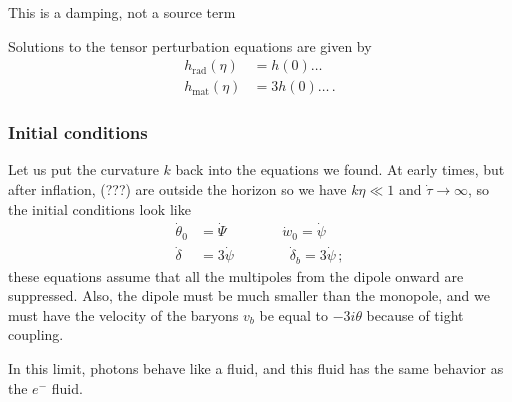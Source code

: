\documentclass[main.tex]{subfiles}
\begin{document}
This is a damping, not a source term


Solutions to the tensor perturbation equations are given by 
%
\begin{align}
h _{\text{rad}} (\eta ) &= h(0) \dots  \\
h _{\text{mat}} (\eta ) &= 3 h(0) \dots
\,.
\end{align}

\subsubsection{Initial conditions}

Let us put the curvature \(k\) back into the equations we found. 
At early times, but after inflation, (???) are outside the horizon
so we have \(k \eta \ll 1\) and \(\dot{\tau} \rightarrow \infty \), so the initial conditions look like 
%
\begin{align}
\dot{\theta}_{0} &= \dot{\Psi} 
\qquad \qquad
\dot{w}_{0} = \dot{\psi} \\
\dot{\delta} &= 3 \dot{\psi}   
\qquad  \qquad
\dot{\delta}_{b} = 3 \dot{\psi}
\,;
\end{align}
%
these equations assume that all the multipoles from the dipole onward are suppressed. 
Also, the dipole must be much smaller than the monopole, and we must have the velocity of the baryons \(v_b\) be equal to \(-3 i \theta \) because of tight coupling. 

In this limit, photons behave like a fluid, and this fluid has the same behavior as the \(e^{-}\) fluid.
\end{document}
